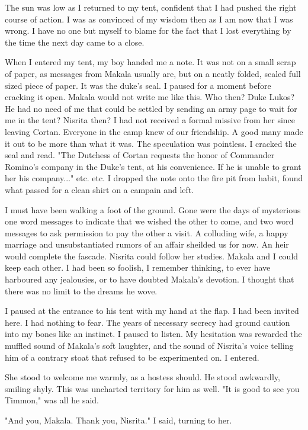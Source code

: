 \documentclass{article}
\begin{document}
The sun was low as I returned to my tent, confident that I had pushed the right course of action. I was as convinced of my wisdom then as I am now that I was wrong. I have no one but myself to blame for the fact that I lost everything by the time the next day came to a close.

When I entered my tent, my boy handed me a note. It was not on a small scrap of paper, as messages from Makala usually are, but on a neatly folded, sealed full sized piece of paper. It was the duke's seal. I paused for a moment before cracking it open. Makala would not write me like this. Who then? Duke Lukos? He had no need of me that could be settled by sending an army page to wait for me in the tent? Nisrita then? I had not received a formal missive from her since leaving Cortan. Everyone in the camp knew of our friendship. A good many made it out to be more than what it was. The speculation was pointless. I cracked the seal and read. "The Dutchess of Cortan requests the honor of Commander Romino's company in the Duke's tent, at his convenience. If he is unable to grant her his company..." etc. etc. I dropped the note onto the fire pit from habit, found what passed for a clean shirt on a campain and left. 

I must have been walking a foot of the ground. Gone were the days of mysterious one word messages to indicate that we wished the other to come, and two word messages to ask permission to pay the other a visit. A colluding wife, a happy marriage and unsubstantiated rumors of an affair sheilded us for now. An heir would complete the fascade. Nisrita could follow her studies. Makala and I could keep each other. I had been so foolish, I remember thinking, to ever have harboured any jealousies, or to have doubted Makala's devotion. I thought that there was no limit to the dreams he wove. 

I paused at the entrance to his tent with my hand at the flap. I had been invited here. I had nothing to fear. The years of necessary secrecy had ground caution into my bones like an instinct. I paused to listen. My hesitation was rewarded the muffled sound of Makala's soft laughter, and the sound of Nisrita's voice telling him of a contrary stoat that refused to be experimented on. I entered.

She stood to welcome me warmly, as a hostess should. He stood awkwardly, smiling shyly. This was uncharted territory for him as well. "It is good to see you Timmon," was all he said. 

"And you, Makala. Thank you, Nisrita." I said, turning to her. 
\end{document}
